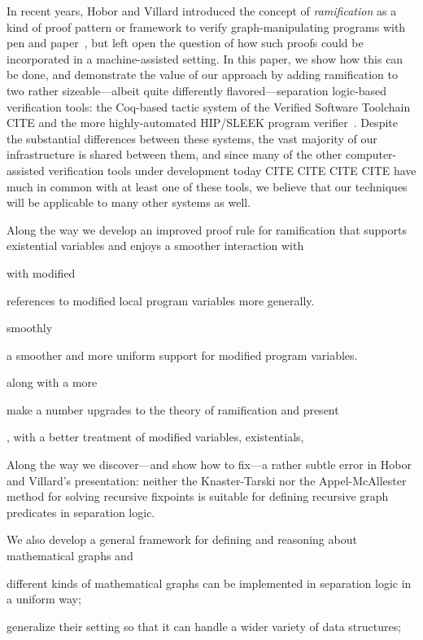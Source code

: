 \documentclass[pldi]{sigplanconf-pldi15}
\begin{document}
In recent years, Hobor and Villard introduced the concept of \emph{ramification} as a kind of proof pattern or framework
to verify graph-manipulating programs with pen and paper~\cite{hobor:ramification}, but left open the question of how such proofs could
be incorporated in a machine-assisted setting.  In this paper, we show how this can be done, and demonstrate the
value of our approach by adding ramification to two rather sizeable---albeit quite differently flavored---separation logic-based
verification tools: the Coq-based tactic system of the Verified Software Toolchain CITE and the more highly-automated HIP/SLEEK
program verifier~\cite{chin:hipsleek}.  Despite the substantial differences between these systems, the vast majority of our infrastructure is
shared between them, and since many of the other computer-assisted verification tools under development
today CITE CITE CITE CITE have much in common with at least one of these tools, we believe that our techniques will be
applicable to many other systems as well.

Along the way we develop an improved proof rule for ramification that supports existential variables and enjoys a smoother interaction with


with modified

 references to modified local program variables more generally.

 smoothly



a smoother and more uniform support for modified program variables.

along with a more

make a number upgrades to the theory of ramification and present

, with a better treatment of modified variables, existentials,

Along the way we discover---and show how to fix---a rather subtle error in Hobor and Villard's presentation: neither the
Knaster-Tarski \cite{tarski:fixpoint} nor the Appel-McAllester \cite{appel:fixpoint} method for solving recursive fixpoints is suitable for defining
recursive graph predicates in separation logic.

  We also develop a general framework for defining and reasoning about mathematical
graphs and

different kinds of mathematical
graphs can be implemented in separation logic in a uniform way;

generalize their setting
so that it can handle a wider variety of data structures;
\end{document}
